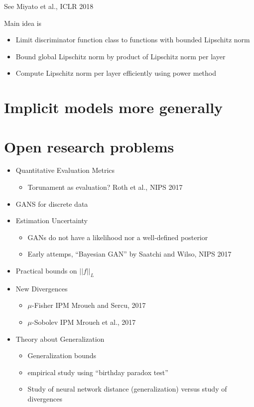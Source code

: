 \documentclass[b5paper]{report}
\begin{document}
See Miyato et al., ICLR 2018 \cite{miyato2018spectral}

Main idea is

\begin{itemize}
  \item Limit discriminator function class to functions with bounded Lipschitz
    norm
  \item Bound global Lipschitz norm by product of Lipschitz norm per layer
  \item Compute Lipschitz norm per layer efficiently using power method
\end{itemize}

\section{Implicit models more generally}
\section{Open research problems}

\begin{itemize}
  \item Quantitative Evaluation Metrics
    \begin{itemize}
      \item Torunament as evaluation? Roth et al., NIPS 2017 \cite{roth2017stabilizing}
    \end{itemize}
  \item GANS for discrete data
  \item Estimation Uncertainty
    \begin{itemize}
      \item GANs do not have a likelihood nor a well-defined posterior
      \item Early attemps, ``Bayesian GAN'' by Saatchi and Wilso, NIPS 2017
        \cite{saatci2017bayesian}
    \end{itemize}
  \item Practical bounds on $||f||_L$
  \item New Divergences
    \begin{itemize}
      \item $\mu$-Fisher IPM Mroueh and Sercu, 2017
      \item $\mu$-Sobolev IPM Mroueh et al., 2017 \cite{mroueh2017sobolev}
    \end{itemize}
  \item Theory about Generalization
    \begin{itemize}
      \item Generalization bounds
      \item empirical study using ``birthday paradox test''
      \item Study of neural network distance (generalization) versus study of
        divergences
    \end{itemize}
\end{itemize}
\end{document}
